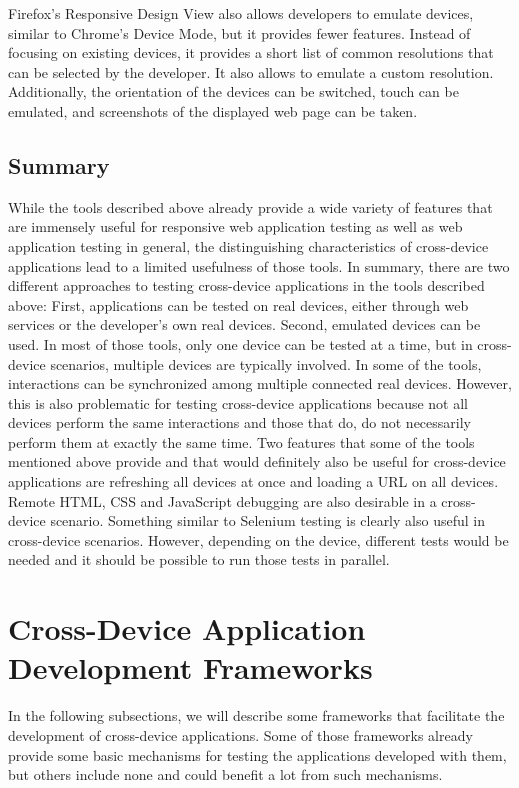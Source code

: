 Firefox's Responsive Design View also allows developers to emulate devices, similar to Chrome's Device Mode, but it provides fewer features. Instead of focusing on existing devices, it provides a short list of common resolutions that can be selected by the developer. It also allows to emulate a custom resolution. Additionally, the orientation of the devices can be switched, touch can be emulated, and screenshots of the displayed web page can be taken.

\subsection{Summary}

While the tools described above already provide a wide variety of features that are immensely useful for responsive web application testing as well as web application testing in general, the distinguishing characteristics of cross-device applications lead to a limited usefulness of those tools. In summary, there are two different approaches to testing cross-device applications in the tools described above: First, applications can be tested on real devices, either through web services or the developer's own real devices. Second, emulated devices can be used. In most of those tools, only one device can be tested at a time, but in cross-device scenarios, multiple devices are typically involved. In some of the tools, interactions can be synchronized among multiple connected real devices. However, this is also problematic for testing cross-device applications because not all devices perform the same interactions and those that do, do not necessarily perform them at exactly the same time. Two features that some of the tools mentioned above provide and that would definitely also be useful for cross-device applications are refreshing all devices at once and loading a URL on all devices. Remote HTML, CSS and JavaScript debugging are also desirable in a cross-device scenario. Something similar to Selenium testing is clearly also useful in cross-device scenarios. However, depending on the device, different tests would be needed and it should be possible to run those tests in parallel.

\section{Cross-Device Application Development Frameworks}

In the following subsections, we will describe some frameworks that facilitate the development of cross-device applications. Some of those frameworks already provide some basic mechanisms for testing the applications developed with them, but others include none and could benefit a lot from such mechanisms.

